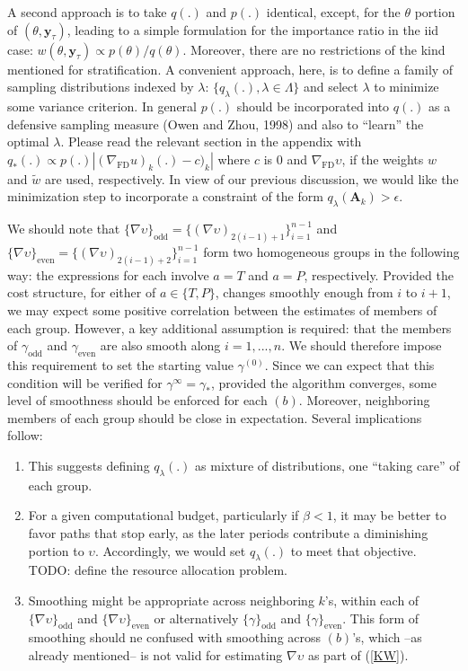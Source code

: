 \documentclass{article}
\begin{document}
A second approach is to take $q(.)$ and $p(.)$ identical, except,
for the $\theta$ portion of $(\theta,\mathbf{y}_{\tau})$, leading to
a simple formulation for the importance ratio in the iid case:
$w(\theta,\mathbf{y}_\tau)\propto p(\theta)/q(\theta)$. Moreover,
there are no restrictions of the kind mentioned for stratification.
A convenient approach, here, is to define a family of sampling
distributions indexed by $\lambda$: $\{q_{\lambda}(.),\lambda\in
\Lambda\}$ and select $\lambda$ to minimize some variance criterion.
In general $p(.)$ should be incorporated into $q(.)$ as a defensive
sampling measure (Owen and Zhou, 1998) and also to ``learn'' the
optimal $\lambda$. Please read the relevant section in the appendix
with $q_*(.)\propto p(.) |(\nabla_{\mathrm{\scriptscriptstyle FD}}
u)_k(.)-c)_k|$ where $c$ is $0$ and
$\nabla_{\mathrm{\scriptscriptstyle FD}} \upsilon$, if the weights
$w$ and $\tilde w$ are used, respectively. In view of our previous
discussion, we would like the minimization step to incorporate a
constraint of the form $q_{\lambda}(\mathbf{A}_k)>\epsilon$.

We should note that $\{\nabla \upsilon\}_{\mathrm{odd}}=\{(\nabla
\upsilon)_{2(i-1)+1}\}_{i=1}^{n-1}$ and $\{\nabla
\upsilon\}_{\mathrm{even}}=\{(\nabla
\upsilon)_{2(i-1)+2}\}_{i=1}^{n-1}$ form two homogeneous groups in
the following way: the expressions for each involve $a=T$ and $a=P$,
respectively. Provided the cost structure, for either of
$a\in\{T,P\}$, changes smoothly enough from $i$ to $i+1$, we may
expect some positive correlation between the estimates of members of
each group. However, a key additional assumption is required: that
the members of $\gamma_{\mathrm{odd}}$ and $\gamma_{\mathrm{even}}$
are also smooth along $i=1,...,{n}$. We should therefore impose this
requirement to set the starting value $\gamma^{(0)}$. Since we can
expect that this condition will be verified for
$\gamma^{\infty}=\gamma_*$, provided the algorithm converges, some
level of smoothness should be enforced for each $(b)$. Moreover,
neighboring members of each group should be close in expectation.
Several implications follow:
\begin{enumerate}
\item This suggests defining $q_\lambda(.)$ as mixture of
distributions, one ``taking care'' of each group.
\item For a given computational budget, particularly if
$\beta<1$, it may be better to favor paths that stop early, as the
later periods contribute a diminishing portion to $\upsilon$.
Accordingly, we would set $q_{\lambda}(.)$ to meet that objective.
TODO: define the resource allocation problem.
\item Smoothing
might be appropriate across neighboring $k$'s, within each of
$\{\nabla \upsilon\}_{\mathrm{odd}}$ and $\{\nabla
\upsilon\}_{\mathrm{even}}$ or alternatively
$\{\gamma\}_{\mathrm{odd}}$ and $\{\gamma\}_{\mathrm{even}}$. This
form of smoothing should ne confused with smoothing across $(b)$'s,
which --as already mentioned-- is not valid for estimating $\nabla
\upsilon$ as part of (\ref{KW}).
\end{enumerate}
\end{document}

